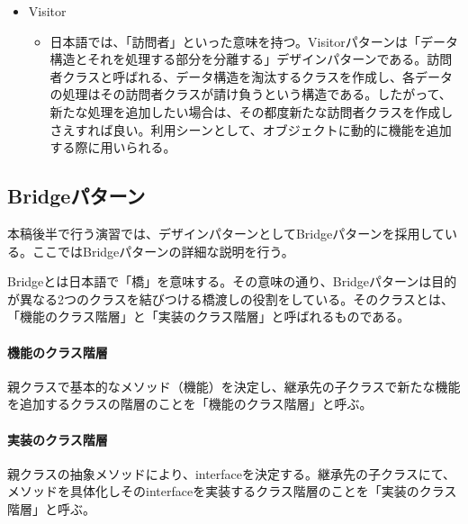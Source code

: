 \documentclass[dvipdfmx]{jsarticle}
\begin{document}
\begin{itemize}
\begin{itemize}
  \end{itemize}
  \item Visitor
  \begin{itemize}
    \item 日本語では、「訪問者」といった意味を持つ。Visitorパターンは「データ構造とそれを処理する部分を分離する」デザインパターンである。訪問者クラスと呼ばれる、データ構造を淘汰するクラスを作成し、各データの処理はその訪問者クラスが請け負うという構造である。したがって、新たな処理を追加したい場合は、その都度新たな訪問者クラスを作成しさえすれば良い。利用シーンとして、オブジェクトに動的に機能を追加する際に用いられる。
  \end{itemize}
\end{itemize}

\subsection{Bridgeパターン}
本稿後半で行う演習では、デザインパターンとしてBridgeパターンを採用している。ここではBridgeパターンの詳細な説明を行う。\par
Bridgeとは日本語で「橋」を意味する。その意味の通り、Bridgeパターンは目的が異なる2つのクラスを結びつける橋渡しの役割をしている。そのクラスとは、「機能のクラス階層」と「実装のクラス階層」と呼ばれるものである。\par
\paragraph{機能のクラス階層}親クラスで基本的なメソッド（機能）を決定し、継承先の子クラスで新たな機能を追加するクラスの階層のことを「機能のクラス階層」と呼ぶ。
\paragraph{実装のクラス階層}親クラスの抽象メソッドにより、interfaceを決定する。継承先の子クラスにて、メソッドを具体化しそのinterfaceを実装するクラス階層のことを「実装のクラス階層」と呼ぶ。\par
\end{document}

